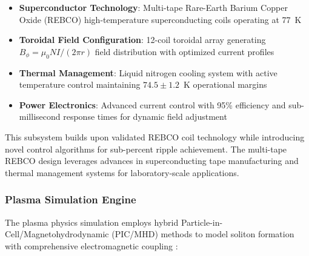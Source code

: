 \documentclass[12pt,a4paper]{article}
\begin{document}
\begin{itemize}
\item \textbf{Superconductor Technology}: Multi-tape Rare-Earth Barium Copper Oxide (REBCO) high-temperature superconducting coils operating at 77~K
\item \textbf{Toroidal Field Configuration}: 12-coil toroidal array generating $B_\phi = \mu_0 NI/(2\pi r)$ field distribution with optimized current profiles
\item \textbf{Thermal Management}: Liquid nitrogen cooling system with active temperature control maintaining $74.5 \pm 1.2$~K operational margins
\item \textbf{Power Electronics}: Advanced current control with 95\% efficiency and sub-millisecond response times for dynamic field adjustment
\end{itemize}

This subsystem builds upon validated REBCO coil technology \cite{HTS2024,HTS_Review2022,SuperconductorPhysics2024} while introducing novel control algorithms for sub-percent ripple achievement. The multi-tape REBCO design leverages advances in superconducting tape manufacturing \cite{MagneticConfinement2021} and thermal management systems \cite{PlasmaPhysics2023,PlasmaTheory2023} for laboratory-scale applications.

\subsubsection{Plasma Simulation Engine}

The plasma physics simulation employs hybrid Particle-in-Cell/Magnetohydrodynamic (PIC/MHD) methods to model soliton formation with comprehensive electromagnetic coupling \cite{Maxwell1865,PlasmaTheory2023}:
\end{document}
